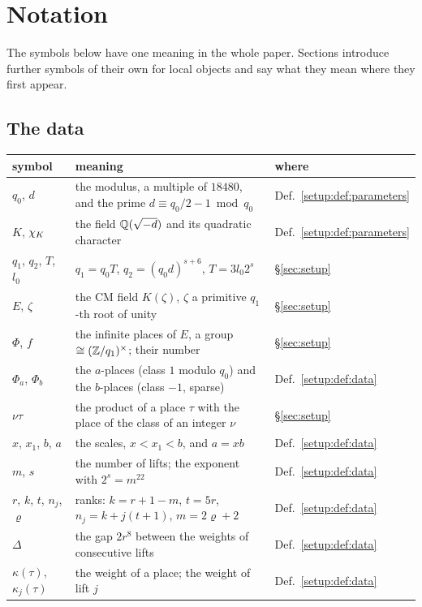 \section{Notation}\label{sec:app-notation}

The symbols below have one meaning in the whole paper. Sections introduce further symbols of
their own for local objects and say what they mean where they first appear.

\subsection*{The data}

\begin{center}\small
\begin{tabular}{@{}l p{} l@{}}
\toprule
symbol & meaning & where \\
\midrule
$q_0$, $d$ & the modulus, a multiple of $18480$, and the prime $d \equiv q_0/2 - 1 \bmod q_0$ & Def.~\ref{setup:def:parameters} \\
$K$, $\chi_K$ & the field $\mathbb{Q}(\sqrt{-d})$ and its quadratic character & Def.~\ref{setup:def:parameters} \\
$q_1$, $q_2$, $T$, $l_0$ & $q_1 = q_0 T$, $q_2 = (q_0 d)^{s+6}$, $T = 3 l_0 2^s$ & \S\ref{sec:setup} \\
$E$, $\zeta$ & the CM field $K(\zeta)$, $\zeta$ a primitive $q_1$-th root of unity & \S\ref{sec:setup} \\
$\Phi$, $f$ & the infinite places of $E$, a group $\cong (\mathbb{Z}/q_1)^\times$; their number & \S\ref{sec:setup} \\
$\Phi_a$, $\Phi_b$ & the $a$-places (class $1$ modulo $q_0$) and the $b$-places (class $-1$, sparse) & Def.~\ref{setup:def:data} \\
$\nu\tau$ & the product of a place $\tau$ with the place of the class of an integer $\nu$ & \S\ref{sec:setup} \\
$x$, $x_1$, $b$, $a$ & the scales, $x < x_1 < b$, and $a = x b$ & Def.~\ref{setup:def:data} \\
$m$, $s$ & the number of lifts; the exponent with $2^s = m^{22}$ & Def.~\ref{setup:def:data} \\
$r$, $k$, $t$, $n_j$, $\varrho$ & ranks: $k = r+1-m$, $t = 5r$, $n_j = k + j(t+1)$, $m = 2\varrho + 2$ & Def.~\ref{setup:def:data} \\
$\Delta$ & the gap $2r^8$ between the weights of consecutive lifts & Def.~\ref{setup:def:data} \\
$\kappa(\tau)$, $\kappa_j(\tau)$ & the weight of a place; the weight of lift $j$ & Def.~\ref{setup:def:data} \\

\end{tabular}
\end{center}
